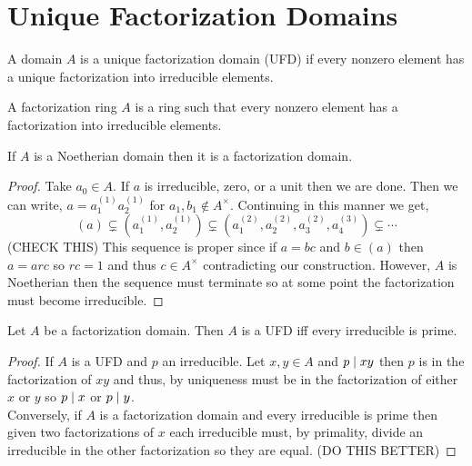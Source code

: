 \documentclass[12pt]{article}
\begin{document}
\section{Unique Factorization Domains}

\begin{definition}
A domain $A$ is a unique factorization domain (UFD) if every nonzero element has a unique factorization into irreducible elements. 
\end{definition}

\begin{definition}
A factorization ring $A$ is a ring such that every nonzero element has a factorization into irreducible elements.
\end{definition}

\begin{lemma}
If $A$ is a Noetherian domain then it is a factorization domain.
\end{lemma}

\begin{proof}
Take $a_0 \in A$. If $a$ is irreducible, zero, or a unit then we are done. Then we can write, $a = a^{(1)}_1 a^{(1)}_2$ for $a_1, b_1 \notin A^\times$. Continuing in this manner we get,
\[ (a) \subsetneq (a^{(1)}_1, a^{(1)}_2) \subsetneq (a^{(2)}_1, a^{(2)}_2, a^{(2)}_3, a^{(3)}_4) \subsetneq \cdots \]
(CHECK THIS)
This sequence is proper since if $a = bc$ and $b \in (a)$ then $a = arc$ so $rc = 1$ and thus $c \in A^\times$ contradicting our construction. However, $A$ is Noetherian then the sequence must terminate so at some point the factorization must become irreducible. 
\end{proof}

\begin{theorem}
Let $A$ be a factorization domain. Then $A$ is a UFD iff every irreducible is prime. 
\end{theorem}

\begin{proof}
If $A$ is a UFD and $p$ an irreducible. Let $x, y \in A$ and $p \mid xy$ then $p$ is in the factorization of $xy$ and thus, by uniqueness must be in the factorization of either $x$ or $y$ so $p \mid x$ or $p \mid y$.
\bigskip\\
Conversely, if $A$ is a factorization domain and every irreducible is prime then given two factorizations of $x$ each irreducible must, by primality, divide an irreducible in the other factorization so they are equal. 
(DO THIS BETTER)
\end{proof}
\end{document}
